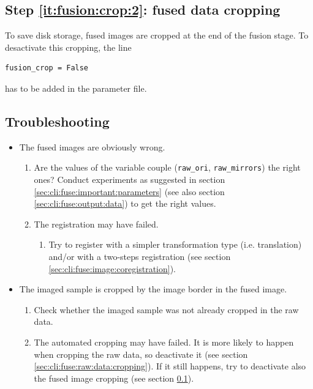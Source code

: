 \subsection{Step \ref{it:fusion:crop:2}: fused data cropping}
\label{sec:cli:fuse:fused:data:cropping}

To save disk storage, fused images are cropped at the end of the fusion stage. To desactivate this cropping, the line
\begin{verbatim}
fusion_crop = False
\end{verbatim}
has to be added in the parameter file.

\subsection{Troubleshooting}

\begin{itemize}

\item The fused images are obviously wrong.
  \begin{enumerate}
  \item Are the values of the variable couple (\texttt{raw\_ori}, \texttt{raw\_mirrors}) the right ones? Conduct experiments as suggested in section \ref{sec:cli:fuse:important:parameters}  (see also section \ref{sec:cli:fuse:output:data}) to get the right values.
  \item The registration may have failed.
    \begin{enumerate}
    \item Try to register with a simpler transformation type (i.e. translation) and/or with a two-steps registration (see section \ref{sec:cli:fuse:image:coregistration}).
    \end{enumerate}
  \end{enumerate}
\item The imaged sample is cropped by the image border in the fused image.
  \begin{enumerate}
  \item Check whether the imaged sample was not already cropped in the raw data.
  \item The automated cropping may have failed. It is more likely to happen when cropping the raw data, so deactivate it (see section \ref{sec:cli:fuse:raw:data:cropping}). If it still happens, try to deactivate also the fused image cropping   (see section \ref{sec:cli:fuse:fused:data:cropping}).
  \end{enumerate}
\end{itemize}


